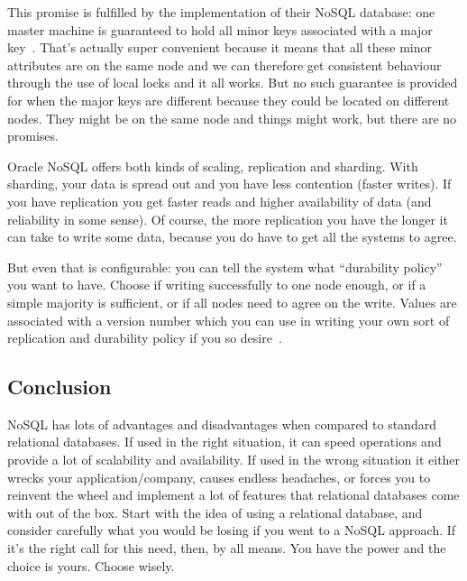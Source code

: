 This promise is fulfilled by the implementation of their NoSQL database: one master machine is guaranteed to hold all minor keys associated with a major key~\cite{oraclenosql}. That's actually super convenient because it means that all these minor attributes are on the same node and we can therefore get consistent behaviour through the use of local locks and it all works. But no such guarantee is provided for when the major keys are different because they could be located on different nodes. They might be on the same node and things might work, but there are no promises. 

Oracle NoSQL offers both kinds of scaling, replication and sharding. With sharding, your data is spread out and you have less contention (faster writes). If you have replication you get faster reads and higher availability of data (and reliability in some sense). Of course, the more replication you have the longer it can take to write some data, because you do have to get all the systems to agree. 

But even that is configurable: you can tell the system what ``durability policy'' you want to have. Choose if writing successfully to one node enough, or if a simple majority is sufficient, or if all nodes need to agree on the write. Values are associated with a version number which you can use in writing your own sort of replication and durability policy if you so desire~\cite{oraclenosql}.

\subsection*{Conclusion}

NoSQL has lots of advantages and disadvantages when compared to standard relational databases. If used in the right situation, it can speed operations and provide a lot of scalability and availability. If used in the wrong situation it either wrecks your application/company, causes endless headaches, or forces you to reinvent the wheel and implement a lot of features that relational databases come with out of the box. Start with the idea of using a relational database, and consider carefully what you would be losing if you went to a NoSQL approach. If it's the right call for this need, then, by all means. You have the power and the choice is yours. Choose wisely.





